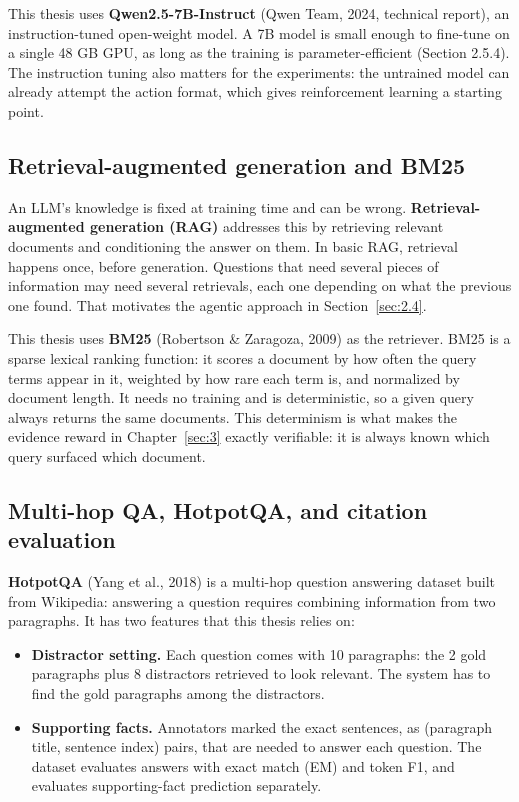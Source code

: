 This thesis uses \textbf{Qwen2.5-7B-Instruct} (Qwen Team, 2024,
technical report), an instruction-tuned open-weight model. A 7B model is
small enough to fine-tune on a single 48 GB GPU, as long as the training
is parameter-efficient (Section 2.5.4). The instruction tuning also
matters for the experiments: the untrained model can already attempt the
action format, which gives reinforcement learning a starting point.

\subsection{Retrieval-augmented generation and BM25}\label{sec:2.2}

An LLM's knowledge is fixed at training time and can be wrong.
\textbf{Retrieval-augmented generation (RAG)} addresses this by
retrieving relevant documents and conditioning the answer on them. In
basic RAG, retrieval happens once, before generation. Questions that
need several pieces of information may need several retrievals, each one
depending on what the previous one found. That motivates the agentic
approach in Section~\ref{sec:2.4}.

This thesis uses \textbf{BM25} (Robertson \& Zaragoza, 2009) as the
retriever. BM25 is a sparse lexical ranking function: it scores a
document by how often the query terms appear in it, weighted by how rare
each term is, and normalized by document length. It needs no training
and is deterministic, so a given query always returns the same
documents. This determinism is what makes the evidence reward in
Chapter~\ref{sec:3} exactly verifiable: it is always known which query
surfaced which document.

\subsection{Multi-hop QA, HotpotQA, and citation
evaluation}\label{sec:2.3}

\textbf{HotpotQA} (Yang et al., 2018) is a multi-hop question answering
dataset built from Wikipedia: answering a question requires combining
information from two paragraphs. It has two features that this thesis
relies on:

\begin{itemize}
\tightlist
\item
  \textbf{Distractor setting.} Each question comes with 10 paragraphs:
  the 2 gold paragraphs plus 8 distractors retrieved to look relevant.
  The system has to find the gold paragraphs among the distractors.
\item
  \textbf{Supporting facts.} Annotators marked the exact sentences, as
  (paragraph title, sentence index) pairs, that are needed to answer
  each question. The dataset evaluates answers with exact match (EM) and
  token F1, and evaluates supporting-fact prediction separately.
\end{itemize}

